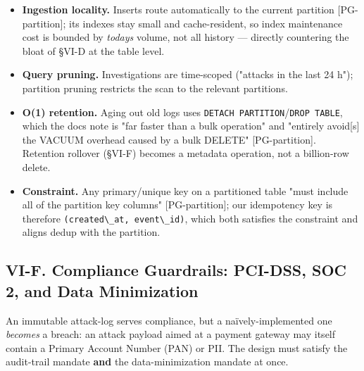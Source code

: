 \begin{itemize}
\tightlist
\item
  \textbf{Ingestion locality.} Inserts route automatically to the
  current partition {[}PG-partition{]}; its indexes stay small and
  cache-resident, so index maintenance cost is bounded by
  \emph{today\textquotesingle s} volume, not all history --- directly
  countering the bloat of §VI-D at the table level.
\item
  \textbf{Query pruning.} Investigations are time-scoped ("attacks in
  the last 24 h"); partition pruning restricts the scan to the relevant
  partitions.
\item
  \textbf{O(1) retention.} Aging out old logs uses
  \passthrough{\lstinline!DETACH PARTITION!}/\passthrough{\lstinline!DROP TABLE!},
  which the docs note is "far faster than a bulk operation" and
  "entirely avoid{[}s{]} the VACUUM overhead caused by a bulk DELETE"
  {[}PG-partition{]}. Retention rollover (§VI-F) becomes a metadata
  operation, not a billion-row delete.
\item
  \textbf{Constraint.} Any primary/unique key on a partitioned table
  "must include all of the partition key columns" {[}PG-partition{]};
  our idempotency key is therefore
  \passthrough{\lstinline!(created\_at, event\_id)!}, which both
  satisfies the constraint and aligns dedup with the partition.
\end{itemize}

\subsection{VI-F. Compliance Guardrails: PCI-DSS, SOC 2, and Data
Minimization}\label{vi-f-compliance-guardrails-pci-dss-soc-2-and-data-minimization}

An immutable attack-log serves compliance, but a naïvely-implemented one
\emph{becomes} a breach: an attack payload aimed at a payment gateway
may itself contain a Primary Account Number (PAN) or PII. The design
must satisfy the audit-trail mandate \textbf{and} the data-minimization
mandate at once.

